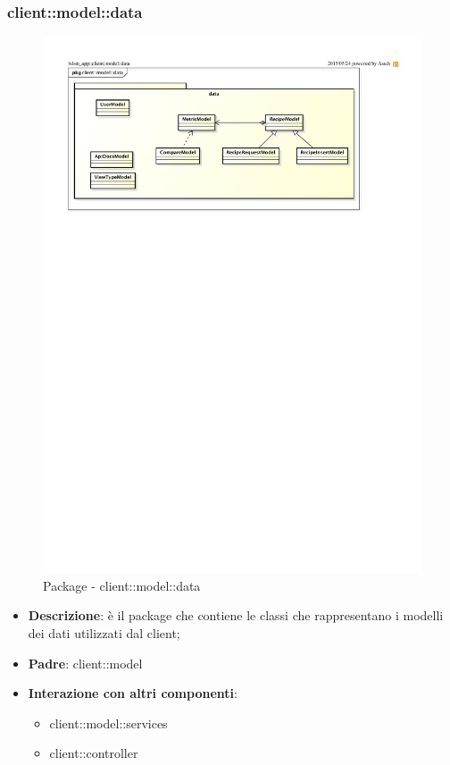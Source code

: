 \subsubsection{client::model::data} %
\label{ssub:bdsm_app_client_model_data}
\begin{figure}[htbp]
	\centering
	\centerline{\includegraphics[scale=0.95]{./images/client/client_model_data.pdf}}
	\caption{Package - client::model::data}
\end{figure}

\begin{itemize}
	\item \textbf{Descrizione}: è il package che contiene le classi che rappresentano i modelli dei dati utilizzati dal client;
	\item \textbf{Padre}: client::model
	\item \textbf{Interazione con altri componenti}:
		\begin{itemize}
			\item client::model::services
			\item client::controller
		\end{itemize}
\end{itemize}

